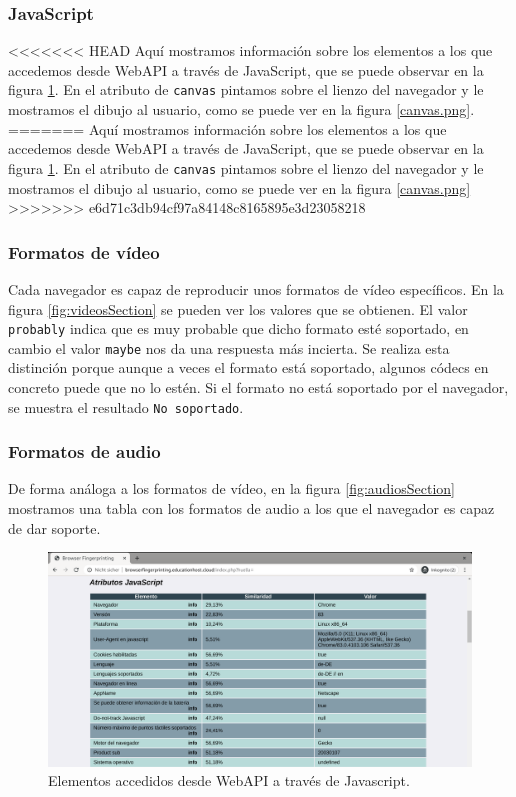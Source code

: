 \subsubsection{JavaScript}
<<<<<<< HEAD
Aquí mostramos información sobre los elementos a los que accedemos desde WebAPI a través de JavaScript, que se puede observar en la figura \ref{fig:javaScriptSection.png}. En el atributo de \texttt{canvas} pintamos sobre el lienzo del navegador y le mostramos el dibujo al usuario, como se puede ver en la figura \ref{canvas.png}.
=======
Aquí mostramos información sobre los elementos a los que accedemos desde WebAPI a través de JavaScript, que se puede observar en la figura \ref{fig:javaScriptSection.png}. En el atributo de \texttt{canvas} pintamos sobre el lienzo del navegador y le mostramos el dibujo al usuario, como se puede ver en la figura \ref{canvas.png}
>>>>>>> e6d71c3db94cf97a84148c8165895e3d23058218

\subsubsection{Formatos de vídeo}
Cada navegador es capaz de reproducir unos formatos de vídeo específicos. En la figura \ref{fig:videosSection} se pueden ver los valores que se obtienen. El valor \texttt{probably} indica que es muy probable que dicho formato esté soportado, en cambio el valor \texttt{maybe} nos da una respuesta más incierta. Se realiza esta distinción porque aunque a veces el formato está soportado, algunos códecs en concreto puede que no lo estén. Si el formato no está soportado por el navegador, se muestra el resultado \texttt{No soportado}.

\subsubsection{Formatos de audio}
De forma análoga a los formatos de vídeo, en la figura \ref{fig:audiosSection} mostramos una tabla con los formatos de audio a los que el navegador es capaz de dar soporte.

\begin{figure}[tbp]
	\centering
	\includegraphics[width=1\textwidth]{Images/javaScriptSection.png}
	\caption{Elementos accedidos desde WebAPI a través de Javascript.}
	\label{fig:javaScriptSection.png}
\end{figure}

